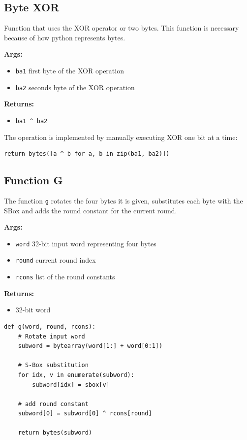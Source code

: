 \subsection{Byte XOR}
\label{ch:byte_xor}
Function that uses the XOR operator or two bytes. This function is necessary because of how python represents bytes.

\textbf{Args:}
\begin{itemize}
  \item \lstinline{ba1} first byte of the XOR operation
  \item \lstinline{ba2} seconds byte of the XOR operation
\end{itemize}

\textbf{Returns:}
\begin{itemize}
  \item \lstinline{ba1 ^ ba2}
\end{itemize}

The operation is implemented by manually executing XOR one bit at a time:
\begin{lstlisting}
return bytes([a ^ b for a, b in zip(ba1, ba2)])
\end{lstlisting}


\subsection{Function G}
\label{ch:func_g}

The function \lstinline{g} rotates the four bytes it is given, substitutes each byte with the SBox and adds the round constant for the current round.

\textbf{Args:}
\begin{itemize}
  \item \lstinline{word} 32-bit input word representing four bytes
  \item \lstinline{round} current round index
  \item \lstinline{rcons} list of the round constants
\end{itemize}

\textbf{Returns:}
\begin{itemize}
  \item 32-bit word
\end{itemize}

\begin{lstlisting}
def g(word, round, rcons):
    # Rotate input word
    subword = bytearray(word[1:] + word[0:1])

    # S-Box substitution
    for idx, v in enumerate(subword):
        subword[idx] = sbox[v]

    # add round constant
    subword[0] = subword[0] ^ rcons[round]

    return bytes(subword)
\end{lstlisting}


